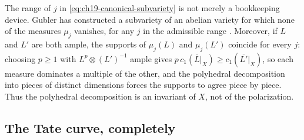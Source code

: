 \begin{remark}
\label{rem:ch19-canonical-pieces}
The range of $j$ in \eqref{eq:ch19-canonical-subvariety} is not merely a
bookkeeping device.  Gubler has constructed a subvariety of an abelian
variety for which none of the measures $\mu_j$ vanishes, for any
$j$ in the admissible range \cite[Remark~19.3.4\,c)]{CLD25}.  Moreover, if
$L$ and $L'$ are both ample, the supports of $\mu_j(L)$ and
$\mu_j(L')$ coincide for every $j$: choosing $p\geq1$ with
$L^p\otimes(L')^{-1}$ ample gives
$p\,c_1(\overline L|_X)\geq c_1(\overline{L'}|_X)$, so each measure
dominates a multiple of the other, and the polyhedral decomposition into
pieces of distinct dimensions forces the supports to agree piece by piece.
Thus the polyhedral decomposition is an invariant of $X$, not of the
polarization.
\end{remark}

\subsection{The Tate curve, completely}
\label{sec:ch19-tate-canonical}

